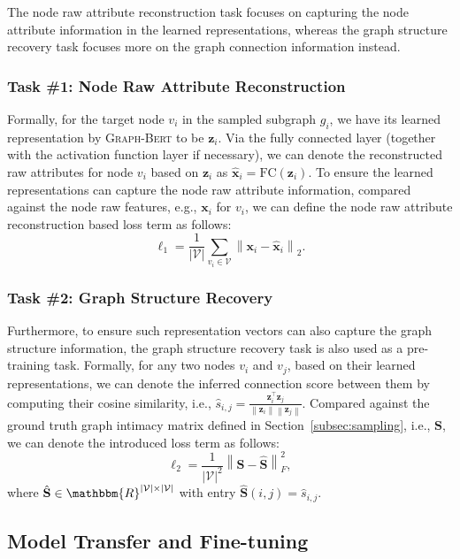 \documentclass{article}
\newcommand{\mb}{\mathbf}
\newcommand{\mc}{\mathcal}
\newcommand{\our}{\textsc{Graph-Bert}}
\begin{document}
The node raw attribute reconstruction task focuses on capturing the node attribute information in the learned representations, whereas the graph structure recovery task focuses more on the graph connection information instead.

\subsubsection{Task \#1: Node Raw Attribute Reconstruction}

Formally, for the target node $v_i$ in the sampled subgraph $g_i$, we have its learned representation by {\our} to be $\mb{z}_i$. Via the fully connected layer (together with the activation function layer if necessary), we can denote the reconstructed raw attributes for node $v_i$ based on $\mb{z}_i$ as $\hat{\mb{x}}_i = \mbox{FC}(\mb{z}_i)$. To ensure the learned representations can capture the node raw attribute information, compared against the node raw features, e.g., $\mb{x}_i$ for $v_i$, we can define the node raw attribute reconstruction based loss term as follows:
\begin{equation}
\ell_{1} = \frac{1}{|\mc{V}|} \sum_{v_i \in \mc{V}} \left\| \mb{x}_i - \hat{\mb{x}}_i  \right\|_2.
\end{equation}

\subsubsection{Task \#2: Graph Structure Recovery}

Furthermore, to ensure such representation vectors can also capture the graph structure information, the graph structure recovery task is also used as a pre-training task. Formally, for any two nodes $v_i$ and $v_j$, based on their learned representations, we can denote the inferred connection score between them by computing their cosine similarity, i.e., $\hat{s}_{i,j} = \frac{\mb{z}_i^\top \mb{z}_j}{ \left\|  \mb{z}_i \right\| \left\| \mb{z}_j \right\|}$. Compared against the ground truth graph intimacy matrix defined in Section~\ref{subsec:sampling}, i.e., ${\mb{S}}$, we can denote the introduced loss term as follows:
\begin{equation}
\ell_2 =\frac{1}{|\mc{V}|^2} \left\| \mb{S} -\hat{\mb{S}} \right\|_F^2,
\end{equation}
where $\hat{\mb{S}} \in \mathbbm{R}^{|\mc{V}| \times |\mc{V}|}$ with entry $\hat{\mb{S}}(i,j) = \hat{s}_{i,j}$.


\subsection{Model Transfer and Fine-tuning}
\end{document}
